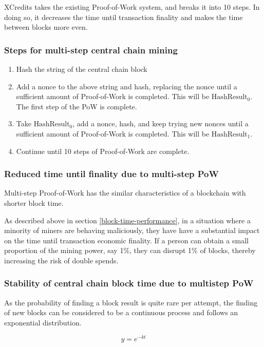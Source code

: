 \documentclass[a4paper,12pt]{article}
\begin{document}
XCredits takes the existing Proof-of-Work system, and breaks it into 10 steps. In doing so, it decreases the time until transaction finality and makes the time between blocks more even. 

\subsubsection{Steps for multi-step central chain mining}

\begin{enumerate}
  \item Hash the string of the central chain block
  \item Add a nonce to the above string and hash, replacing the nonce until a sufficient amount of Proof-of-Work is completed. This will be $\text{HashResult}_0$. The first step of the PoW is complete. 
  \item Take $\text{HashResult}_0$, add a nonce, hash, and keep trying new nonces until  a sufficient amount of Proof-of-Work is completed. This will be $\text{HashResult}_1$.
  \item Continue until 10 steps of Proof-of-Work are complete. 
\end{enumerate}

\subsubsection{Reduced time until finality due to multi-step PoW}
Multi-step Proof-of-Work has the similar characteristics of a blockchain with shorter block time. 

As described above in section \ref{block-time-performance}, in a situation where a minority of miners are behaving maliciously, they have have a substantial impact on the time until transaction economic finality. If a person can obtain a small proportion of the mining power, say 1\%, they can disrupt 1\% of blocks, thereby increasing the risk of double spends. 


\subsubsection{Stability of central chain block time due to multistep PoW}

As the probability of finding a block result is quite rare per attempt, the finding of new blocks can be considered to be a continuous process and follows an exponential distribution.

\[ y=e^{-kt}\]
\end{document}
